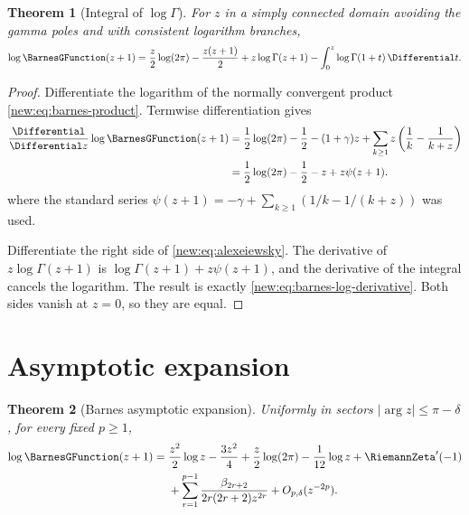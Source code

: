 \documentclass[11pt,a4paper,oneside,openany]{book}
\newtheorem{theorem}{Theorem}[chapter]
\theoremstyle{definition}
\theoremstyle{remark}
\begin{document}
\begin{theorem}[Integral of $\log\Gamma$]
For $z$ in a simply connected domain avoiding the gamma poles and with
consistent logarithm branches,
\begin{equation}
 \log \BarnesGFunction(z+1)
 =\frac z2\log(2\pi)-\frac{z(z+1)}2
  +z\log\Gamma(z+1)
  -\int_0^z\log\Gamma(1+t)\,\Differential t.
 \label{new:eq:alexeiewsky}
\end{equation}
\end{theorem}

\begin{proof}
Differentiate the logarithm of the normally convergent product
\eqref{new:eq:barnes-product}.  Termwise differentiation gives
\begin{equation}
\begin{aligned}
 \frac{\Differential}{\Differential z}\log \BarnesGFunction(z+1)
 &=\frac12\log(2\pi)-\frac12-(1+\gamma)z
   +\sum_{k\ge1}z\left(\frac1k-\frac1{k+z}\right)\\
 &=\frac12\log(2\pi)-\frac12-z+z\psi(z+1).
\end{aligned}
\label{new:eq:barnes-log-derivative}
\end{equation}
where the standard series
$\psi(z+1)=-\gamma+\sum_{k\ge1}(1/k-1/(k+z))$ was used.

Differentiate the right side of \eqref{new:eq:alexeiewsky}.  The derivative of
$z\log\Gamma(z+1)$ is
$\log\Gamma(z+1)+z\psi(z+1)$, and the derivative of the integral cancels the
logarithm.  The result is exactly
\eqref{new:eq:barnes-log-derivative}.  Both sides vanish at $z=0$, so they are
equal.
\end{proof}

\section{Asymptotic expansion}

\begin{theorem}[Barnes asymptotic expansion]
Uniformly in sectors $|\arg z|\le\pi-\delta$, for every fixed $p\ge1$,
\begin{align}
 \log \BarnesGFunction(z+1)
 ={}&\frac{z^2}{2}\log z-\frac{3z^2}{4}
 +\frac z2\log(2\pi)-\frac1{12}\log z+\RiemannZeta'(-1)
 \notag\\
 &+\sum_{r=1}^{p-1}
   \frac{\beta_{2r+2}}{2r(2r+2)z^{2r}}
 +O_{p,\delta}(z^{-2p}).
 \label{new:eq:barnes-asymptotic}
\end{align}
\end{theorem}
\end{document}
